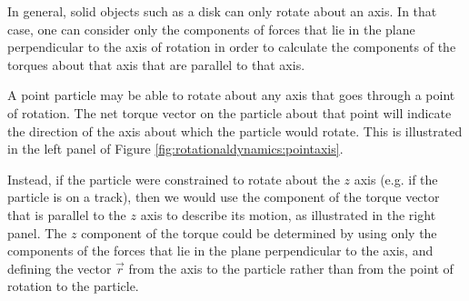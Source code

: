 In general, solid objects such as a disk can only rotate about an axis. In that case, one can consider only the components of forces that lie in the plane perpendicular to the axis of rotation in order to calculate the components of the torques about that axis that are parallel to that axis. 

A point particle may be able to rotate about any axis that goes through a point of rotation. The net torque vector on the particle about that point will indicate the direction of the axis about which the particle would rotate. This is illustrated in the left panel of Figure \ref{fig:rotationaldynamics:pointaxis}.

Instead, if the particle were constrained to rotate about the $z$ axis (e.g. if the particle is on a track), then we would use the component of the torque vector that is parallel to the $z$ axis to describe its motion, as illustrated in the right panel. The $z$ component of the torque could be determined by using only the components of the forces that lie in the plane perpendicular to the axis, and defining the vector $\vec r$ from the axis to the particle rather than from the point of rotation to the particle.


